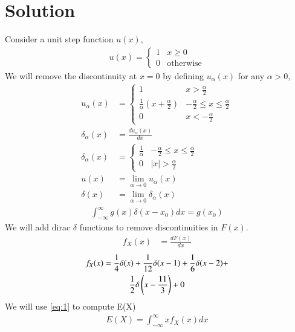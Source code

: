 \documentclass[journal,12pt,twocolumn]{IEEEtran}
\begin{document}
\section*{Solution}
Consider a unit step function $u(x)$,
\begin{align}
u(x) = 
    \begin{cases}
        1 & x \geq 0 \\
        0 & \text{otherwise}
    \end{cases}
\end{align}
We will remove the discontinuity at $x=0$ by defining $u_{\alpha}(x)$ for any $\alpha > 0$,
\begin{align}
u_{\alpha}(x) &= 
    \begin{cases}
        1 & x > \frac{\alpha}{2} \\
        \frac{1}{\alpha}(x + \frac{\alpha}{2}) & -\frac{\alpha}{2} \leq x \leq \frac{\alpha}{2} \\
        0 & x < -\frac{\alpha}{2}
    \end{cases}\\
\delta_{\alpha}(x) &= \frac{du_{\alpha}(x)}{dx}\\
\delta_{\alpha}(x) &=
    \begin{cases}
        \frac{1}{\alpha} & -\frac{\alpha}{2} \leq x \leq \frac{\alpha}{2} \\
        0 & |x| > \frac{\alpha}{2}
    \end{cases}\\
u(x) &= \lim_{\alpha \to 0} u_{\alpha}(x)\\
\delta (x) &= \lim_{\alpha \to 0} \delta_{\alpha}(x)
\end{align}
\begin{align}
    \int_{-\infty}^{\infty}g(x)\delta(x-x_0)dx = g(x_0) \label{eq:1}
\end{align}
We will add dirac $\delta$ functions to remove discontinuities in $F(x)$.
\begin{align}
    f_{X}(x) &= \frac{dF(x)}{dx}
\end{align}
\begin{multline}
    f_{X}(x) = \frac{1}{4}\delta(x) + \frac{1}{12}\delta(x - 1) + \frac{1}{6}\delta(x-2) +\\ \frac{1}{2}\delta\left(x-\frac{11}{3}\right) + 0
\end{multline}
We will use \eqref{eq:1} to compute E(X)
\begin{align}
    E(X) = \int_{-\infty}^{\infty}xf_X(x)dx
\end{align}
\end{document}
